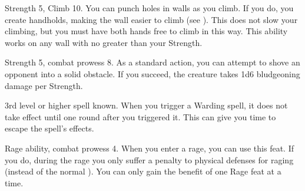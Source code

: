 \featpres Strength 5, Climb 10.
\featben You can punch holes in walls as you climb.
If you do, you create handholds, making the wall easier to climb (see ).
This does not slow your climbing, but you must have both hands free to climb in this way.
This ability works on any wall with  no greater than your Strength.

\featpres Strength 5, combat prowess 8.
\featben As a standard action, you can attempt to shove an opponent into a solid obstacle.
If you succeed, the creature takes 1d6 bludgeoning damage per Strength.

\featpre 3rd level or higher  spell known.
\featben When you trigger a Warding spell, it does not take effect until one round after you triggered it. This can give you time to escape the spell's effects.

\featpres Rage ability, combat prowess 4.
\featben When you enter a rage, you can use this feat. If you do, during the rage you only suffer a  penalty to physical defenses for raging (instead of the normal ).
 You can only gain the benefit of one Rage feat at a time.

